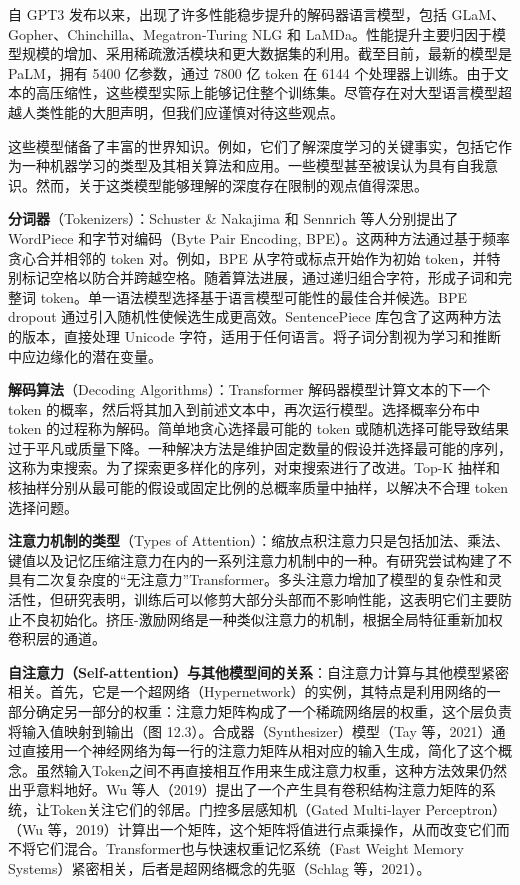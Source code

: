 \documentclass[lang=cn,newtx,10pt,scheme=chinese]{elegantbook}
\begin{document}
自 GPT3 发布以来，出现了许多性能稳步提升的解码器语言模型，包括 GLaM、Gopher、Chinchilla、Megatron-Turing NLG 和 LaMDa。性能提升主要归因于模型规模的增加、采用稀疏激活模块和更大数据集的利用。截至目前，最新的模型是 PaLM，拥有 5400 亿参数，通过 7800 亿 token 在 6144 个处理器上训练。由于文本的高压缩性，这些模型实际上能够记住整个训练集。尽管存在对大型语言模型超越人类性能的大胆声明，但我们应谨慎对待这些观点。

这些模型储备了丰富的世界知识。例如，它们了解深度学习的关键事实，包括它作为一种机器学习的类型及其相关算法和应用。一些模型甚至被误认为具有自我意识。然而，关于这类模型能够理解的深度存在限制的观点值得深思。

\textbf{分词器}（Tokenizers）：Schuster \& Nakajima 和 Sennrich 等人分别提出了 WordPiece 和字节对编码（Byte Pair Encoding, BPE）。这两种方法通过基于频率贪心合并相邻的 token 对。例如，BPE 从字符或标点开始作为初始 token，并特别标记空格以防合并跨越空格。随着算法进展，通过递归组合字符，形成子词和完整词 token。单一语法模型选择基于语言模型可能性的最佳合并候选。BPE dropout 通过引入随机性使候选生成更高效。SentencePiece 库包含了这两种方法的版本，直接处理 Unicode 字符，适用于任何语言。将子词分割视为学习和推断中应边缘化的潜在变量。

\textbf{解码算法}（Decoding Algorithms）：Transformer 解码器模型计算文本的下一个 token 的概率，然后将其加入到前述文本中，再次运行模型。选择概率分布中 token 的过程称为解码。简单地贪心选择最可能的 token 或随机选择可能导致结果过于平凡或质量下降。一种解决方法是维护固定数量的假设并选择最可能的序列，这称为束搜索。为了探索更多样化的序列，对束搜索进行了改进。Top-K 抽样和核抽样分别从最可能的假设或固定比例的总概率质量中抽样，以解决不合理 token 选择问题。

\textbf{注意力机制的类型}（Types of Attention）：缩放点积注意力只是包括加法、乘法、键值以及记忆压缩注意力在内的一系列注意力机制中的一种。有研究尝试构建了不具有二次复杂度的“无注意力”Transformer。多头注意力增加了模型的复杂性和灵活性，但研究表明，训练后可以修剪大部分头部而不影响性能，这表明它们主要防止不良初始化。挤压-激励网络是一种类似注意力的机制，根据全局特征重新加权卷积层的通道。

\textbf{自注意力（Self-attention）与其他模型间的关系}：自注意力计算与其他模型紧密相关。首先，它是一个超网络（Hypernetwork）的实例，其特点是利用网络的一部分确定另一部分的权重：注意力矩阵构成了一个稀疏网络层的权重，这个层负责将输入值映射到输出（图 12.3）。合成器（Synthesizer）模型（Tay 等，2021）通过直接用一个神经网络为每一行的注意力矩阵从相对应的输入生成，简化了这个概念。虽然输入Token之间不再直接相互作用来生成注意力权重，这种方法效果仍然出乎意料地好。Wu 等人（2019）提出了一个产生具有卷积结构注意力矩阵的系统，让Token关注它们的邻居。门控多层感知机（Gated Multi-layer Perceptron）（Wu 等，2019）计算出一个矩阵，这个矩阵将值进行点乘操作，从而改变它们而不将它们混合。Transformer也与快速权重记忆系统（Fast Weight Memory Systems）紧密相关，后者是超网络概念的先驱（Schlag 等，2021）。
\end{document}
